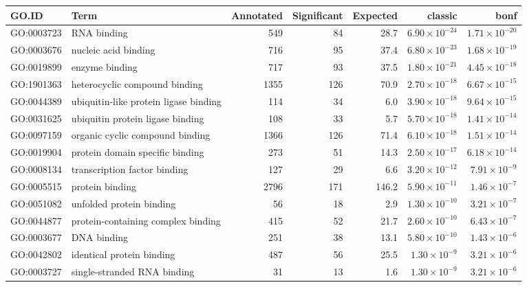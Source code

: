 \begin{table}[ht]
\centering
\begin{adjustbox}{max width=\textwidth}
\begin{tabular}{llrrrrr}
  \hline
GO.ID & Term & Annotated & Significant & Expected & classic & bonf \\ 
  \hline
GO:0003723 & RNA binding & 549 & 84 & 28.7 & $6.90 \times 10^{-24}$ & $1.71 \times 10^{-20}$ \\ 
  GO:0003676 & nucleic acid binding & 716 & 95 & 37.4 & $6.80 \times 10^{-23}$ & $1.68 \times 10^{-19}$ \\ 
  GO:0019899 & enzyme binding & 717 & 93 & 37.5 & $1.80 \times 10^{-21}$ & $4.45 \times 10^{-18}$ \\ 
  GO:1901363 & heterocyclic compound binding & 1355 & 126 & 70.9 & $2.70 \times 10^{-18}$ & $6.67 \times 10^{-15}$ \\ 
  GO:0044389 & ubiquitin-like protein ligase binding & 114 & 34 & 6.0 & $3.90 \times 10^{-18}$ & $9.64 \times 10^{-15}$ \\ 
  GO:0031625 & ubiquitin protein ligase binding & 108 & 33 & 5.7 & $5.70 \times 10^{-18}$ & $1.41 \times 10^{-14}$ \\ 
  GO:0097159 & organic cyclic compound binding & 1366 & 126 & 71.4 & $6.10 \times 10^{-18}$ & $1.51 \times 10^{-14}$ \\ 
  GO:0019904 & protein domain specific binding & 273 & 51 & 14.3 & $2.50 \times 10^{-17}$ & $6.18 \times 10^{-14}$ \\ 
  GO:0008134 & transcription factor binding & 127 & 29 & 6.6 & $3.20 \times 10^{-12}$ & $7.91 \times 10^{-9}$ \\ 
  GO:0005515 & protein binding & 2796 & 171 & 146.2 & $5.90 \times 10^{-11}$ & $1.46 \times 10^{-7}$ \\ 
  GO:0051082 & unfolded protein binding & 56 & 18 & 2.9 & $1.30 \times 10^{-10}$ & $3.21 \times 10^{-7}$ \\ 
  GO:0044877 & protein-containing complex binding & 415 & 52 & 21.7 & $2.60 \times 10^{-10}$ & $6.43 \times 10^{-7}$ \\ 
  GO:0003677 & DNA binding & 251 & 38 & 13.1 & $5.80 \times 10^{-10}$ & $1.43 \times 10^{-6}$ \\ 
  GO:0042802 & identical protein binding & 487 & 56 & 25.5 & $1.30 \times 10^{-9}$ & $3.21 \times 10^{-6}$ \\ 
  GO:0003727 & single-stranded RNA binding & 31 & 13 & 1.6 & $1.30 \times 10^{-9}$ & $3.21 \times 10^{-6}$ \\ 

\end{tabular}
\end{adjustbox}
\end{table}
